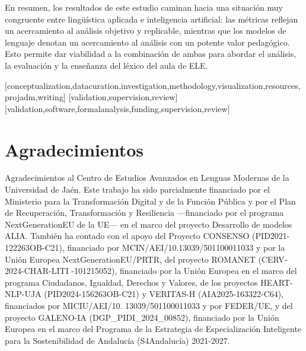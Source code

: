 \documentclass[spanish]{textolivre}
\begin{document}
En resumen, los resultados de este estudio caminan hacia una situación muy congruente entre lingüística aplicada e inteligencia artificial: las métricas reflejan un acercamiento al análisis objetivo y replicable, mientras que los modelos de lenguaje denotan un acercamiento al análisis con un potente valor pedagógico. Esto permite dar viabilidad a la combinación de ambas para abordar el análisis, la evaluación y la enseñanza del léxico del aula de ELE.


\printbibliography\label{sec-bib}


\begin{contributors}
[conceptualization,datacuration,investigation,methodology,visualization,resources,projadm,writing]
[validation,supervision,review]
[validation,software,formalanalysis,funding,supervision,review]
\end{contributors}

\section*{\fontsize{10}{12}\selectfont Agradecimientos}
Agradecimientos al Centro de Estudios Avanzados en Lenguas Modernas de la
Universidad de Jaén. Este trabajo ha sido parcialmente financiado por el Ministerio para la Transformación Digital y de la Función Pública y por el Plan de Recuperación, Transformación y Resiliencia —financiado por el programa NextGenerationEU de la UE— en el marco del proyecto Desarrollo de modelos ALIA. También ha contado con el apoyo del Proyecto CONSENSO (PID2021-122263OB-C21), financiado por MCIN/AEI/10.13039/501100011033 y por la Unión Europea NextGenerationEU/PRTR, del proyecto ROMANET (CERV-2024-CHAR-LITI -101215052), financiado por la Unión Europea en el marco del programa Ciudadanos, Igualdad, Derechos y Valores, de los proyectos HEART-NLP-UJA (PID2024-156263OB-C21) y VERITAS-H (AIA2025-163322-C64), financiados por MICIU/AEI/10. 13039/501100011033 y por FEDER/UE, y del proyecto GALENO-IA (DGP\_PIDI\_2024\_00852), financiado por la Unión Europea en el marco del Programa de la Estrategia de Especialización Inteligente para la Sostenibilidad de Andalucía (S4Andalucía) 2021-2027.

\begin{dataavailability}
\end{dataavailability}
\end{document}
